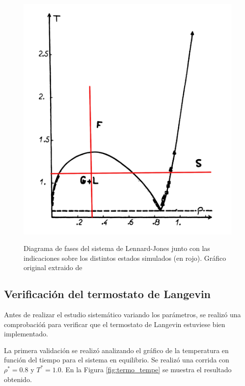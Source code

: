 \documentclass[a4paper,12pt]{article}
\begin{document}
\begin{figure}[H]
	\centering
	\includegraphics[scale=0.13]{fases.png} \\
	\caption{Diagrama de fases del sistema de Lennard-Jones junto con las 
	indicaciones sobre los distintos estados simulados (en rojo). Gráfico 
	original extraido de \cite{hansenverlet1969}}\label{fig:fases}
\end{figure}

\subsection{Verificación del termostato de Langevin}

Antes de realizar el estudio sistemático variando los parámetros, se realizó 
una comprobacióń para verificar que el termostato de Langevin estuviese bien 
implementado.

La primera validación se realizó analizando el gráfico de la temperatura en 
función del tiempo para el sistema en equilibrio. Se realizó una corrida con 
$\rho^*=0.8$ y $T^*=1.0$. En la Figura \eqref{fig:termo_tempe} se muestra el 
resultado obtenido.
\end{document}
